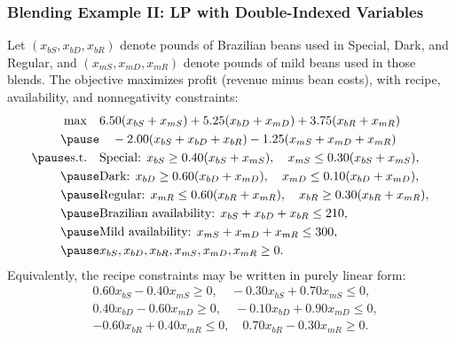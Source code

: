 \documentclass{beamer}
\begin{document}
\begin{frame}[shrink]
\frametitle{Blending Example II: LP with Double-Indexed Variables}
Let \((x_{bS}, x_{bD}, x_{bR})\) denote pounds of Brazilian beans used in Special, Dark, and Regular, and \((x_{mS}, x_{mD}, x_{mR})\) denote pounds of mild beans used in those blends. The objective maximizes profit (revenue minus bean costs), with recipe, availability, and nonnegativity constraints:
\[
\begin{aligned}
\max \quad & 6.50 (x_{bS} + x_{mS}) + 5.25 (x_{bD} + x_{mD}) + 3.75 (x_{bR} + x_{mR}) \\\pause
           & \quad - 2.00 (x_{bS} + x_{bD} + x_{bR}) - 1.25 (x_{mS} + x_{mD} + x_{mR}) \\\pause
\text{s.t.} \quad & \text{Special: } x_{bS} \geq 0.40 (x_{bS} + x_{mS}), \quad x_{mS} \leq 0.30 (x_{bS} + x_{mS}), \\\pause
                  & \text{Dark: } x_{bD} \geq 0.60 (x_{bD} + x_{mD}), \quad x_{mD} \leq 0.10 (x_{bD} + x_{mD}), \\\pause
                  & \text{Regular: } x_{mR} \leq 0.60 (x_{bR} + x_{mR}), \quad x_{bR} \geq 0.30 (x_{bR} + x_{mR}), \\\pause
                  & \text{Brazilian availability: } x_{bS} + x_{bD} + x_{bR} \leq 210, \\\pause
                  & \text{Mild availability: } x_{mS} + x_{mD} + x_{mR} \leq 300, \\\pause
                  & x_{bS}, x_{bD}, x_{bR}, x_{mS}, x_{mD}, x_{mR} \geq 0 .
\end{aligned}
\]
Equivalently, the recipe constraints may be written in purely linear form:
\[
\begin{aligned}
& 0.60 x_{bS} - 0.40 x_{mS} \geq 0, \quad -0.30 x_{bS} + 0.70 x_{mS} \leq 0, \\
& 0.40 x_{bD} - 0.60 x_{mD} \geq 0, \quad -0.10 x_{bD} + 0.90 x_{mD} \leq 0, \\
& -0.60 x_{bR} + 0.40 x_{mR} \leq 0, \quad 0.70 x_{bR} - 0.30 x_{mR} \geq 0.
\end{aligned}
\]
\end{frame}
\end{document}
